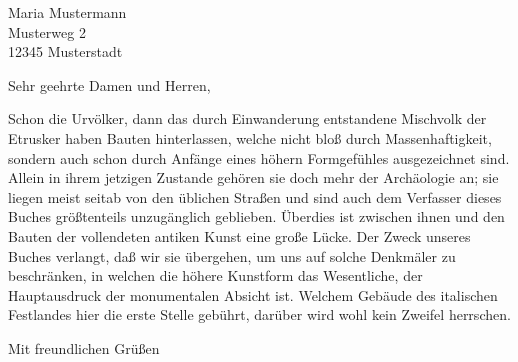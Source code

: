 \documentclass[DIN,parskip=half,fontsize=12pt,fromalign=right,fromrule=afteraddress,ngerman,enlargefirstpage=true]{scrlttr2}
\begin{document}
\begin{letter}{Maria Mustermann \\ Musterweg 2 \\ 12345 Musterstadt}
\opening{Sehr geehrte Damen und Herren,} 

Schon die Urvölker, dann das durch Einwanderung entstandene Mischvolk der Etrusker haben Bauten hinterlassen, welche nicht bloß durch Massenhaftigkeit, sondern auch schon durch Anfänge eines höhern Formgefühles ausgezeichnet sind. Allein in ihrem jetzigen Zustande gehören sie doch mehr der Archäologie an; sie liegen meist seitab von den üblichen Straßen und sind auch dem Verfasser dieses Buches größtenteils unzugänglich geblieben. Überdies ist zwischen ihnen und den Bauten der vollendeten antiken Kunst eine große Lücke. Der Zweck unseres Buches verlangt, daß wir sie übergehen, um uns auf solche Denkmäler zu beschränken, in welchen die höhere Kunstform das Wesentliche, der Hauptausdruck der monumentalen Absicht ist. Welchem Gebäude des italischen Festlandes hier die erste Stelle gebührt, darüber wird wohl kein Zweifel herrschen.
 
\closing{Mit freundlichen Grüßen}
 
\end{letter}
\end{document}
